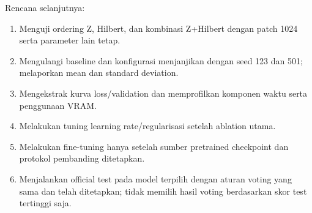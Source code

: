 \documentclass[11pt,a4paper]{article}
\begin{document}
Rencana selanjutnya:
\begin{enumerate}
\item Menguji ordering Z, Hilbert, dan kombinasi Z+Hilbert dengan patch
      1024 serta parameter lain tetap.
\item Mengulangi baseline dan konfigurasi menjanjikan dengan seed 123
      dan 501; melaporkan mean dan standard deviation.
\item Mengekstrak kurva loss/validation dan memprofilkan komponen waktu
      serta penggunaan VRAM.
\item Melakukan tuning learning rate/regularisasi setelah ablation utama.
\item Melakukan fine-tuning hanya setelah sumber pretrained checkpoint
      dan protokol pembanding ditetapkan.
\item Menjalankan official test pada model terpilih dengan aturan voting
      yang sama dan telah ditetapkan; tidak memilih hasil voting berdasarkan
      skor test tertinggi saja.
\end{enumerate}
\end{document}
